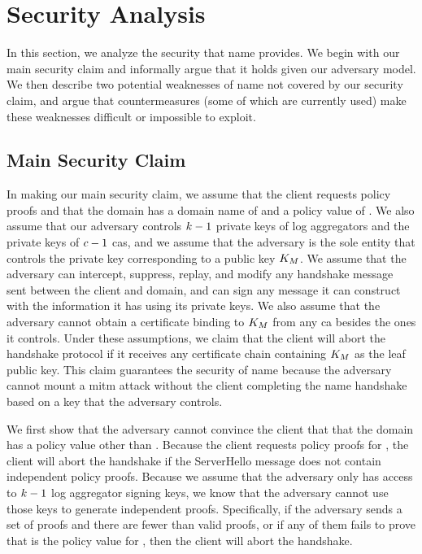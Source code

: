 \section{Security Analysis}
\label{sec:analysis}

In this section, we analyze the security that \ac{name} provides. We begin with
our main security claim and informally argue that it holds given our adversary
model. We then describe two potential weaknesses of \ac{name} not covered by our
security claim, and argue that countermeasures (some of which are currently
used) make these weaknesses difficult or impossible to exploit.


\subsection{Main Security Claim}
\label{sec:analysis:informal}

In making our main security claim, we assume that the client requests \numlas
policy proofs and that the domain has a domain name of \domain and a policy
value of \policy. 
We also assume that our adversary controls $k - 1$
private keys of log aggregators and the private keys of $c - 1$ \acp{ca},
and we assume that the adversary is the sole entity that controls the private
key corresponding to a public key $K_M$. We assume that the adversary
can intercept, suppress, replay, and modify any handshake message sent between
the client and domain, and can sign any message it can construct with the
information it has using its private keys. We also assume that the adversary
cannot obtain a certificate binding \domain to $K_M$ from any \ac{ca}
besides the ones it controls. Under these assumptions, we claim that the client
will abort the handshake protocol if it receives any certificate chain
containing $K_M$ as the leaf public key. This claim 
guarantees the security of \ac{name} because the adversary cannot mount a
\ac{mitm} attack without the client completing the \ac{name} handshake based on
a key that the adversary controls.

We first show that the adversary cannot convince the client that that the domain
has a policy value other than \policy. Because the client requests \numlas
policy proofs for \domain, the client will abort the handshake if the 
ServerHello message does not contain \numlas independent policy
proofs. Because we assume that the adversary only has access to $k - 1$
log aggregator signing keys, we know that the adversary cannot use those keys to
generate \numlas independent proofs. Specifically, if the adversary sends a set
of proofs and there are fewer than \numlas valid proofs, or if any of them fails
to prove that \policy is the policy value for \domain, then the client will
abort the handshake.

